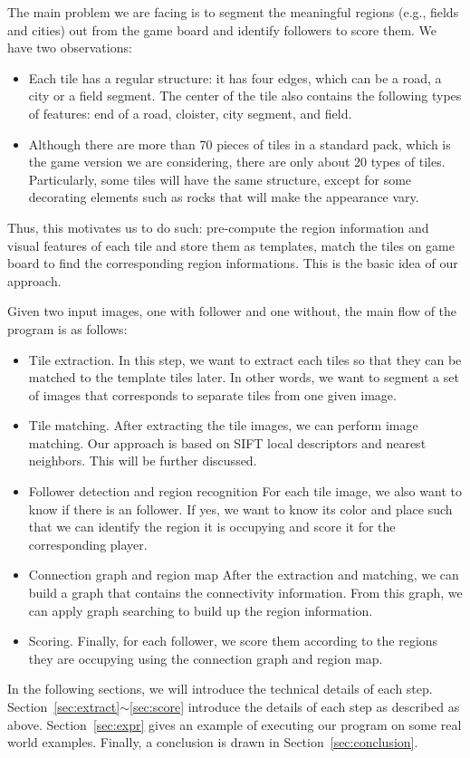 The main problem we are facing is to segment the meaningful regions (e.g.,
fields and cities) out from the game board and identify followers to score
them. We have two observations:
\begin{itemize}
  \item Each tile has a regular structure:
   it has four edges, which can be a road, a city or a field segment.
   The center of the tile also contains the following types of features:
   end of a road, cloister, city segment, and field.
 \item Although there are more than 70 pieces of tiles in a standard pack,
   which is the game version we are considering, there are only 
   about 20 types of tiles. Particularly, some tiles will have the same
   structure, except for some decorating elements such as rocks
   that will make the appearance vary.
\end{itemize}
Thus, this motivates us to do such:
pre-compute the region information and visual features of each tile and store
them as templates, match the tiles on game board to find the corresponding
region informations. This is the basic idea of our approach.

Given two input images, one with follower and one without, 
the main flow of the program is as follows:
\begin{itemize}
\item Tile extraction.
In this step, we want to extract each tiles so that 
they can be matched to the template tiles later.
In other words, we want to segment a set of images that
corresponds to separate tiles from one given image.
\item Tile matching.
After extracting the tile images, we can perform image matching.
Our approach is based on SIFT local descriptors and nearest neighbors.
This will be further discussed.
\item Follower detection and region recognition
For each tile image, we also want to know if there is an follower.
If yes, we want to know its color and place such that we can 
identify the region it is occupying and score it for the corresponding player.
\item Connection graph and region map
  After the extraction and matching, we can build a graph
  that contains the connectivity information.
  From this graph, we can apply graph searching to build up the 
  region information.
\item Scoring. Finally, for each follower, we score them according
  to the regions they are occupying using the connection graph and
  region map.
\end{itemize}

In the following sections, we will introduce the technical details
of each step. 
Section~\ref{sec:extract}$\sim$\ref{sec:score} introduce the details
of each step as described as above.
Section~\ref{sec:expr} gives an example of executing our program
on some real world examples.
Finally, a conclusion is drawn in Section~\ref{sec:conclusion}.
